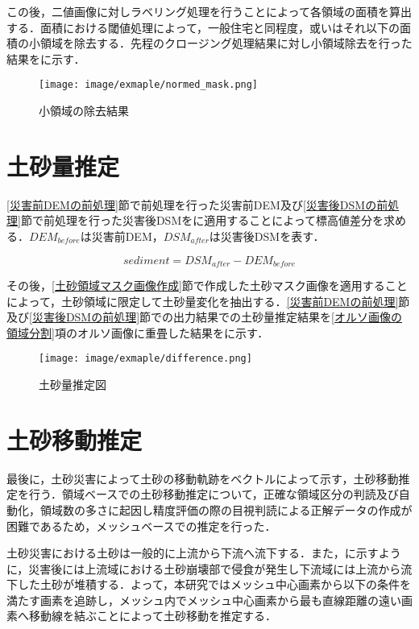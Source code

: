       この後，二値画像に対しラベリング処理を行うことによって各領域の面積を算出する．面積における閾値処理によって，一般住宅と同程度，或いはそれ以下の面積の小領域を除去する．先程のクロージング処理結果に対し小領域除去を行った結果をに示す．
      
      \begin{figure}[t]
        \centering
        \texttt{[image: image/exmaple/normed\_mask.png]}
        \caption{小領域の除去結果}
        \label{小領域除去}
      \end{figure}



  \section{土砂量推定}
    \label{土砂量推定}
    \ref{災害前DEMの前処理}節で前処理を行った災害前DEM及び\ref{災害後DSMの前処理}節で前処理を行った災害後DSMをに適用することによって標高値差分を求める．$DEM_{before}$は災害前DEM，$DSM_{after}$は災害後DSMを表す．
    
    \begin{equation}
      \label{土砂量推定式}
      sediment = DSM_{after} - DEM_{before}
    \end{equation}

    その後，\ref{土砂領域マスク画像作成}節で作成した土砂マスク画像を適用することによって，土砂領域に限定して土砂量変化を抽出する．\ref{災害前DEMの前処理}節及び\ref{災害後DSMの前処理}節での出力結果での土砂量推定結果を\ref{オルソ画像の領域分割}項のオルソ画像に重畳した結果をに示す．

    \begin{figure}[t]
      \centering
      \texttt{[image: image/exmaple/difference.png]}
      \caption{土砂量推定図}
      \label{土砂量推定結果}
    \end{figure}



  \section{土砂移動推定}
    \label{土砂移動推定}
    最後に，土砂災害によって土砂の移動軌跡をベクトルによって示す，土砂移動推定を行う．領域ベースでの土砂移動推定について，正確な領域区分の判読及び自動化，領域数の多さに起因し精度評価の際の目視判読による正解データの作成が困難であるため，メッシュベースでの推定を行った．

    土砂災害における土砂は一般的に上流から下流へ流下する．また，に示すように，災害後には上流域における土砂崩壊部で侵食が発生し下流域には上流から流下した土砂が堆積する\cite{土砂量解析5}．よって，本研究ではメッシュ中心画素から以下の条件を満たす画素を追跡し，メッシュ内でメッシュ中心画素から最も直線距離の遠い画素へ移動線を結ぶことによって土砂移動を推定する．

